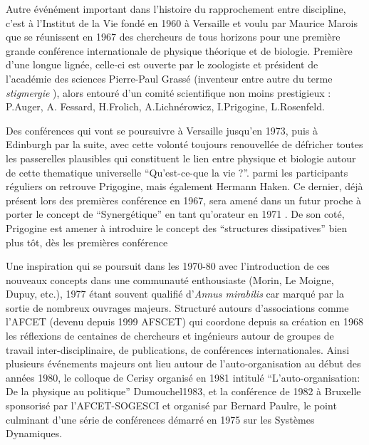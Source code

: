 Autre événément important dans l'histoire du rapprochement entre discipline, c'est à l'Institut de la Vie fondé en 1960 à Versaille et voulu par Maurice Marois que se réunissent en 1967 des chercheurs de tous horizons pour une première grande conférence internationale de physique théorique et de biologie. Première d'une longue lignée, celle-ci est ouverte par le zoologiste et président de l'académie des sciences Pierre-Paul Grassé (inventeur entre autre du terme \textit{stigmergie} \autocite{Theraulaz1999}), alors entouré d'un comité scientifique non moins prestigieux : P.Auger, A. Fessard, H.Frolich, A.Lichnérowicz, I.Prigogine, L.Rosenfeld. \autocites{Marois1969,Marois1971}

Des conférences qui vont se poursuivre à Versaille jusqu'en 1973, puis à Edinburgh par la suite, avec cette volonté toujours renouvellée de défricher toutes les passerelles plausibles qui constituent le lien entre physique et biologie autour de cette thematique universelle \enquote{Qu'est-ce-que la vie ?}. parmi les participants réguliers on retrouve Prigogine, mais également Hermann Haken. Ce dernier, déjà présent lors des premières conférence en 1967, sera amené dans un futur proche à porter le concept de \enquote{Synergétique} en tant qu'orateur en 1971 \autocite{Kroger2012, Kroger2015}. De son coté,  Prigogine est amener à introduire le concept des \enquote{structures dissipatives} bien plus tôt, dès les premières conférence \autocite[60]{CREA1985}

Une inspiration qui se poursuit dans les 1970-80 avec l'introduction de ces nouveaux concepts dans une communauté enthousiaste (Morin, Le Moigne, Dupuy, etc.), 1977 étant souvent qualifié d'\textit{Annus mirabilis} car marqué par la sortie de nombreux ouvrages majeurs. Structuré autours d'associations comme l'AFCET (devenu depuis 1999 AFSCET) qui coordone depuis sa création en 1968 \autocite{Hoffsaes1990} les réflexions de centaines de chercheurs et ingénieurs autour de groupes de travail inter-disciplinaire, de publications, de conférences internationales. Ainsi plusieurs événements majeurs ont lieu autour de l'auto-organisation au début des années 1980, le colloque de Cerisy organisé en 1981 intitulé \enquote{L'auto-organisation: De la physique au politique} \autocite*[postnote]{key}{Dumouchel1983}, et la conférence de 1982 à Bruxelle sponsorisé par l'AFCET-SOGESCI et organisé par Bernard Paulre, le point culminant d'une série de conférences démarré en 1975 sur les Systèmes Dynamiques.



